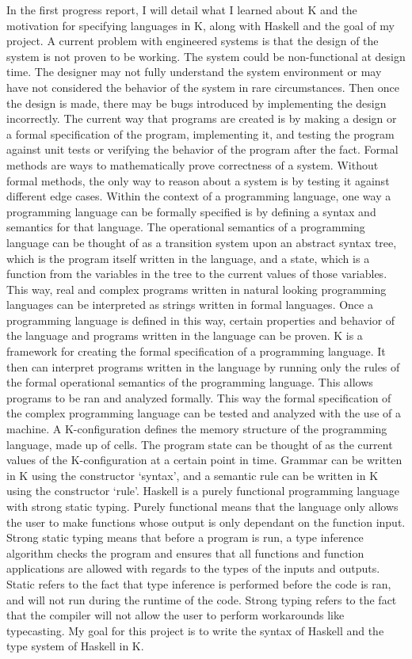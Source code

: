 In the first progress report, I will detail what I learned about K and the motivation for specifying languages in K, along with Haskell and the goal of my project.
A current problem with engineered systems is that the design of the system is not proven to be working. The system could be non-functional at design time. The designer may not fully understand the system environment or may have not considered the behavior of the system in rare circumstances. Then once the design is made, there may be bugs introduced by implementing the design incorrectly.
The current way that programs are created is by making a design or a formal specification of the program, implementing it, and testing the program against unit tests or verifying the behavior of the program after the fact.
Formal methods are ways to mathematically prove correctness of a system. Without formal methods, the only way to reason about a system is by testing it against different edge cases.
Within the context of a programming language, one way a programming language can be formally specified is by defining a syntax and semantics for that language.
The operational semantics of a programming language can be thought of as a transition system upon an abstract syntax tree, which is the program itself written in the language, and a state, which is a function from the variables in the tree to the current values of those variables. 
This way, real and complex programs written in natural looking programming languages can be interpreted as strings written in formal languages. Once a programming language is defined in this way, certain properties and behavior of the language and programs written in the language can be proven.
K is a framework for creating the formal specification of a programming language. It then can interpret programs written in the language by running only the rules of the formal operational semantics of the programming language. This allows programs to be ran and analyzed formally. This way the formal specification of the complex programming language can be tested and analyzed with the use of a machine.
A K-configuration defines the memory structure of the programming language, made up of cells. The program state can be thought of as the current values of the K-configuration at a certain point in time.
Grammar can be written in K using the constructor ‘syntax’, and a semantic rule can be written in K using the constructor ‘rule’.
Haskell is a purely functional programming language with strong static typing. Purely functional means that the language only allows the user to make functions whose output is only dependant on the function input. Strong static typing means that before a program is run, a type inference algorithm checks the program and ensures that all functions and function applications are allowed with regards to the types of the inputs and outputs. Static refers to the fact that type inference is performed before the code is ran, and will not run during the runtime of the code. Strong typing refers to the fact that the compiler will not allow the user to perform workarounds like typecasting.
My goal for this project is to write the syntax of Haskell and the type system of Haskell in K.
